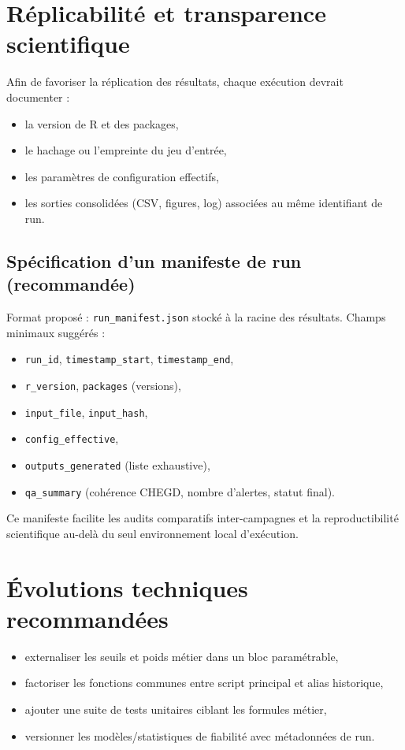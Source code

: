 \documentclass[11pt,a4paper]{article}
\begin{document}
\section{Réplicabilité et transparence scientifique}
Afin de favoriser la réplication des résultats, chaque exécution devrait documenter :
\begin{itemize}[leftmargin=1.2cm]
  \item la version de R et des packages,
  \item le hachage ou l'empreinte du jeu d'entrée,
  \item les paramètres de configuration effectifs,
  \item les sorties consolidées (CSV, figures, log) associées au même identifiant de run.
\end{itemize}

\subsection{Spécification d'un manifeste de run (recommandée)}
Format proposé : \texttt{run\_manifest.json} stocké à la racine des résultats.
Champs minimaux suggérés :
\begin{itemize}[leftmargin=1.2cm]
  \item \texttt{run\_id}, \texttt{timestamp\_start}, \texttt{timestamp\_end},
  \item \texttt{r\_version}, \texttt{packages} (versions),
  \item \texttt{input\_file}, \texttt{input\_hash},
  \item \texttt{config\_effective},
  \item \texttt{outputs\_generated} (liste exhaustive),
  \item \texttt{qa\_summary} (cohérence CHEGD, nombre d'alertes, statut final).
\end{itemize}

Ce manifeste facilite les audits comparatifs inter-campagnes et la reproductibilité
scientifique au-delà du seul environnement local d'exécution.

\section{Évolutions techniques recommandées}
\begin{itemize}[leftmargin=1.2cm]
  \item externaliser les seuils et poids métier dans un bloc paramétrable,
  \item factoriser les fonctions communes entre script principal et alias historique,
  \item ajouter une suite de tests unitaires ciblant les formules métier,
  \item versionner les modèles/statistiques de fiabilité avec métadonnées de run.
\end{itemize}
\end{document}
